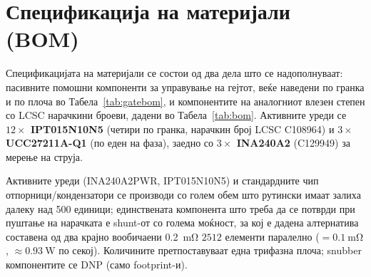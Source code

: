 \documentclass[journal,onecolumn,11pt]{IEEEtran}
\begin{document}
\section{Спецификација на материјали (BOM)}\label{sec:bom}
Спецификацијата на материјали се состои од два дела што се надополнуваат: пасивните
помошни компоненти за управување на гејтот, веќе наведени по гранка и по плоча во
Табела~\ref{tab:gatebom}, и компонентите на аналогниот влезен степен со LCSC
нарачкини броеви, дадени во Табела~\ref{tab:bom}. Активните уреди се
\textbf{$12\times$ IPT015N10N5} (четири по гранка, нарачкин број LCSC C108964) и
\textbf{$3\times$ UCC27211A-Q1} (по еден на фаза), заедно со \textbf{$3\times$ INA240A2}
(C129949) за мерење на струја.

Активните уреди (INA240A2PWR, IPT015N10N5) и стандардните чип отпорници/кондензатори
се производи со голем обем што рутински имаат залиха далеку над \num{500} единици;
единствената компонента што треба да се потврди при пуштање на нарачката е shunt-от со
голема моќност, за кој е дадена алтернатива составена од два крајно вообичаени
\SI{0.2}{\milli\ohm} \(2512\) елементи паралелно ($=\SI{0.1}{\milli\ohm}$,
$\approx\SI{0.93}{\watt}$ по секој). Количините претпоставуваат една трифазна плоча;
snubber компонентите се DNP (само footprint-и).
\end{document}
